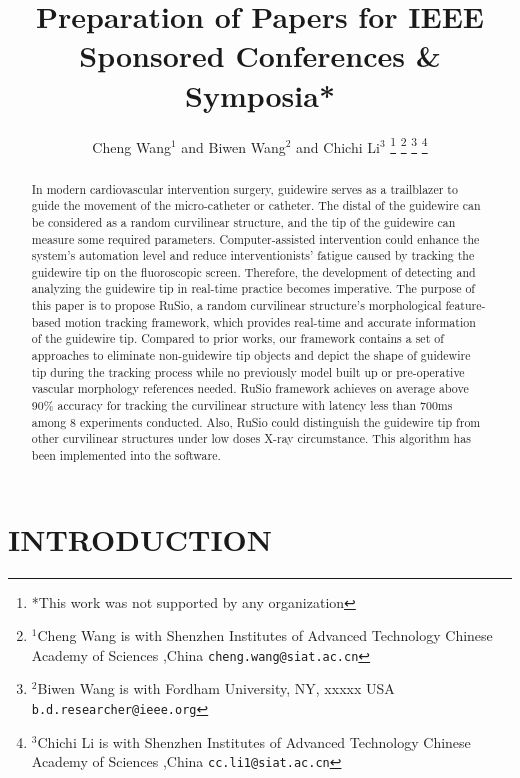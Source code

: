 \documentclass[letterpaper, 10 pt, conference]{ieeeconf}  %
\title{\LARGE \bf
Preparation of Papers for IEEE Sponsored Conferences \& Symposia*
}
\author{Cheng Wang$^{1}$ and Biwen Wang$^{2}$ and Chichi Li$^{3}$%
\thanks{*This work was not supported by any organization}%
\thanks{$^{1}$Cheng Wang is with Shenzhen Institutes of Advanced Technology Chinese Academy of Sciences ,China
        {\tt\small cheng.wang@siat.ac.cn}}%
\thanks{$^{2}$Biwen Wang is with Fordham University, NY, xxxxx USA
        {\tt\small b.d.researcher@ieee.org}}%
\thanks{$^{3}$Chichi Li is with Shenzhen Institutes of Advanced Technology Chinese Academy of Sciences ,China
        {\tt\small cc.li1@siat.ac.cn}}%
}
\begin{document}
\maketitle
\thispagestyle{empty}
\pagestyle{empty}


\begin{abstract}

In modern cardiovascular intervention surgery, guidewire serves as a trailblazer to guide the movement of the micro-catheter or catheter. The distal of the guidewire can be considered as a random curvilinear structure, and the tip of the guidewire can measure some required parameters. Computer-assisted intervention could enhance the system's automation level and reduce interventionists' fatigue caused by tracking the guidewire tip on the fluoroscopic screen. Therefore, the development of detecting and analyzing the guidewire tip in real-time practice becomes imperative. The purpose of this paper is to propose RuSio, a random curvilinear structure's morphological feature-based motion tracking framework, which provides real-time and accurate information of the guidewire tip. Compared to prior works, our framework contains a set of approaches to eliminate non-guidewire tip objects and depict the shape of guidewire tip during the tracking process while no previously model built up or pre-operative vascular morphology references needed. RuSio framework achieves on average above 90\% accuracy for tracking the curvilinear structure with latency less than 700ms among 8 experiments conducted. Also, RuSio could distinguish the guidewire tip from other curvilinear structures under low doses X-ray circumstance. This algorithm has been implemented into the software.

\end{abstract}


\section{INTRODUCTION}
\end{document}
